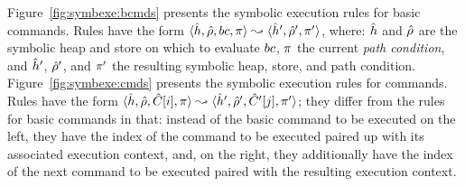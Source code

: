 Figure~\ref{fig:symbexe:bcmds} presents the symbolic execution rules for \jsil basic commands. 
Rules have the form $\langle \hat{h}, \hat\rho, bc, \pi \rangle \leadsto \langle \hat{h}', \hat\rho', \pi' \rangle$, 
where:  $\hat{h}$ and $\hat\rho$ are the symbolic heap and store on which to evaluate $bc$, 
 $\pi$ the current \emph{path condition}, and  $\hat{h}'$, $\hat\rho'$, and $\pi'$
the resulting symbolic heap, store, and path condition. 
Figure~\ref{fig:symbexe:cmds} presents the symbolic execution rules for \jsil commands. 
Rules have the form $\langle \hat{h}, \hat\rho, \hat{C}[i], \pi \rangle \leadsto \langle \hat{h}', \hat\rho', \hat{C}'[j], \pi' \rangle$; 
they differ from the rules for basic commands in that:  instead of the basic command to 
be executed on the left, they have the index of the command to be executed paired up 
with its associated execution context, and,  on the right, they additionally have the 
index of the next command to be executed paired with the resulting execution context. 

